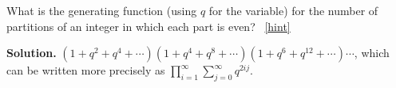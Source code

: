 \documentclass{book}
\begin{document}
\setcounter{project}{321}
\addtocounter{project}{-1}
\begin{activity}[]\label{activity-314}
\hypertarget{p-1661}{}%
What is the generating function (using \(q\) for the variable) for the number of partitions of an integer in which each part is even?%
~\hfill{\tiny\hyperlink{a-321}{[hint]}\hypertarget{q-321}{}}\par\smallskip%
\noindent\textbf{Solution.}\hypertarget{solution-254}{}\quad%
\hypertarget{p-1663}{}%
\((1+q^2+q^4+\cdots)(1+q^4+q^8+\cdots)(1+q^6+q^{12}+\cdots)\cdots\), which can be written more precisely as \(\displaystyle\prod_{i=1}^\infty
\sum_{j=0}^\infty q^{2ij}\).%
\end{activity}
\end{document}

